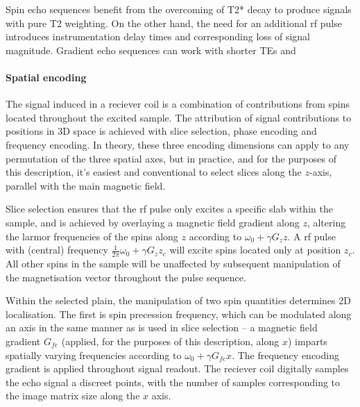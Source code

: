 Spin echo sequences benefit from the overcoming of T2* decay to produce signals with pure T2 weighting. 
On the other hand, the need for an additional \gls{rf} pulse introduces instrumentation delay times and corresponding loss of signal magnitude.
Gradient echo sequences can work with shorter TEs  and 


\paragraph{Spatial encoding}

The signal induced in a reciever coil is a combination of contributions from spins located throughout the excited sample.
The attribution of signal contributions to positions in 3D space is achieved with slice selection, phase encoding and frequency encoding.
In theory, these three encoding dimensions can apply to any permutation of the three spatial axes, but in practice, and for the purposes of this description, it's easiest and conventional to select slices along the $z$-axis, parallel with the main magnetic field. 


Slice selection ensures that the \gls{rf} pulse only excites a specific slab within the sample, and is achieved by overlaying a magnetic field gradient along $z$, altering the larmor frequencies of the spins along $z$ according to $\omega_0 + \gamma G_zz$.
A \gls{rf} pulse with (central) frequency $\frac{1}{2\pi}\omega_0 + \gamma G_zz_c$  will excite spins located only at position $z_c$.
All other spins in the sample will be unaffected by subsequent manipulation of the magnetisation vector throughout the pulse sequence.

Within the selected plain, the manipulation of two spin quantities determines 2D localisation.
The first is spin precession frequency, which can be modulated along an axis in the same manner as is used in slice selection -- a magnetic field gradient $G_{fe}$ (applied, for the purposes of this description, along $x$) imparts spatially varying frequencies according to $\omega_0 + \gamma G_{fe}x$.
The frequency encoding gradient is applied throughout signal readout. 
The reciever coil digitally samples the echo signal a discreet points, with the number of samples corresponding to the image matrix size along the $x$ axis.

